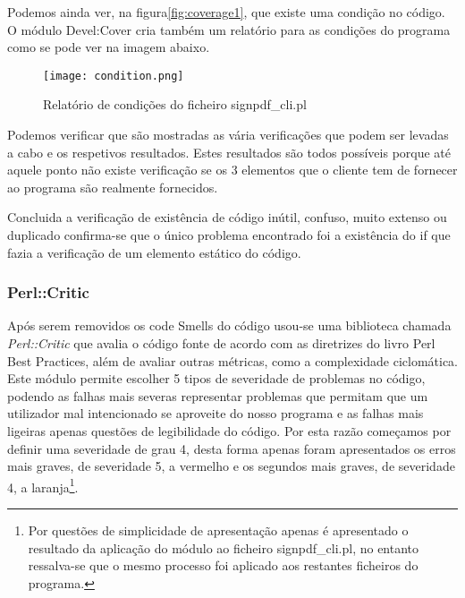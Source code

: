 \par Podemos ainda ver, na figura\ref{fig:coverage1}, que existe uma condição no código. O módulo Devel:Cover cria também um relatório para as condições do programa como se pode ver na imagem abaixo.

\begin{figure}[H]

  \centering
  \captionsetup{justification=centering}

  \texttt{[image: condition.png]}
  
  \caption {Relatório de condições do ficheiro signpdf\_cli.pl}

\end{figure}

Podemos verificar que são mostradas as vária verificações que podem ser levadas a cabo e os respetivos resultados. Estes resultados são todos possíveis porque até aquele ponto não existe verificação se os 3 elementos que o cliente tem de fornecer ao programa são realmente fornecidos.
\par Concluida a verificação de existência de código inútil, confuso, muito extenso ou duplicado confirma-se que o único problema encontrado foi a existência do if que fazia a verificação de um elemento estático do código.


\subsubsection{Perl::Critic}
\hfill\newline

\par Após serem removidos os code Smells do código usou-se uma biblioteca chamada \textit{Perl::Critic}\cite{perlCritic} que avalia o código fonte de acordo com as diretrizes do livro Perl Best Practices\cite{bestpractices}, além de avaliar outras métricas, como a complexidade ciclomática. Este módulo permite escolher 5 tipos de severidade de problemas no código, podendo as falhas mais severas representar problemas que permitam que um utilizador mal intencionado se aproveite do nosso programa e as falhas mais ligeiras apenas questões de legibilidade do código. Por esta razão começamos por definir uma severidade de grau 4, desta forma apenas foram apresentados os erros mais graves, de severidade 5, a vermelho e os segundos mais graves, de severidade 4, a laranja\footnote{Por questões de simplicidade de apresentação apenas é apresentado o resultado da aplicação do módulo ao ficheiro signpdf\_cli.pl, no entanto ressalva-se que o mesmo processo foi aplicado aos restantes ficheiros do programa.}.

